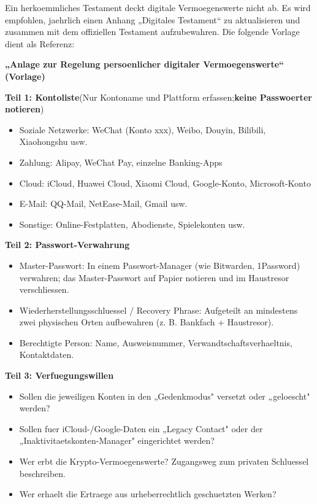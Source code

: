 Ein herkoemmliches Testament deckt digitale Vermoegenswerte nicht ab. Es wird empfohlen, jaehrlich einen Anhang „Digitales Testament“ zu aktualisieren und zusammen mit dem offiziellen Testament aufzubewahren. Die folgende Vorlage dient als Referenz:

\textbf{„Anlage zur Regelung persoenlicher digitaler Vermoegenswerte“ (Vorlage)}\par

\textbf{Teil 1: Kontoliste}(Nur Kontoname und Plattform erfassen;\textbf{keine Passwoerter notieren})

\begin{itemize}
  \item Soziale Netzwerke: WeChat (Konto xxx), Weibo, Douyin, Bilibili, Xiaohongshu usw.
  \item Zahlung: Alipay, WeChat Pay, einzelne Banking-Apps
  \item Cloud: iCloud, Huawei Cloud, Xiaomi Cloud, Google-Konto, Microsoft-Konto
  \item E-Mail: QQ-Mail, NetEase-Mail, Gmail usw.
  \item Sonstige: Online-Festplatten, Abodienste, Spielekonten usw.
\end{itemize}

\textbf{Teil 2: Passwort-Verwahrung}

\begin{itemize}
  \item Master-Passwort: In einem Passwort-Manager (wie Bitwarden, 1Password) verwahren; das Master-Passwort auf Papier notieren und im Haustresor verschliessen.
  \item Wiederherstellungsschluessel / Recovery Phrase: Aufgeteilt an mindestens zwei physischen Orten aufbewahren (z. B. Bankfach + Haustresor).
  \item Berechtigte Person: Name, Ausweisnummer, Verwandtschaftsverhaeltnis, Kontaktdaten.
\end{itemize}

\textbf{Teil 3: Verfuegungswillen}

\begin{itemize}
  \item Sollen die jeweiligen Konten in den „Gedenkmodus" versetzt oder „geloescht" werden?
  \item Sollen fuer iCloud-/Google-Daten ein „Legacy Contact" oder der „Inaktivitaetskonten-Manager" eingerichtet werden?
  \item Wer erbt die Krypto-Vermoegenswerte? Zugangsweg zum privaten Schluessel beschreiben.
  \item Wer erhaelt die Ertraege aus urheberrechtlich geschuetzten Werken?
\end{itemize}


